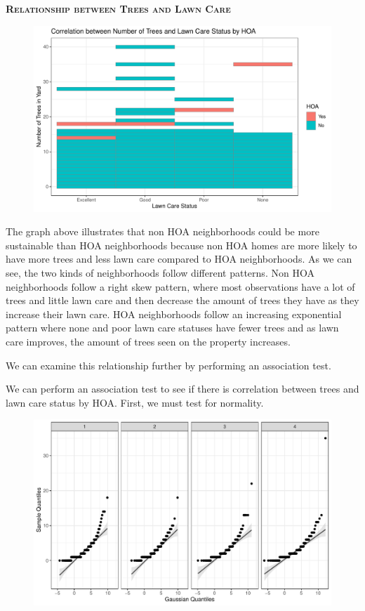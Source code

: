 \documentclass{article}
\begin{document}
\newpage
\textsc{\textbf{Relationship between Trees and Lawn Care}}
\newline
\newline
\begin{figure}[H]
		\centering
\includegraphics{exam23-038}
		\label{Fig:plot15}
	\end{figure}
The graph above illustrates that non HOA neighborhoods could be more sustainable than HOA neighborhoods because non HOA homes are more likely to have more trees and less lawn care compared to HOA neighborhoods. As we can see, the two kinds of neighborhoods follow different patterns. Non HOA neighborhoods follow a right skew pattern, where most observations have a lot of trees and little lawn care and then decrease the amount of trees they have as they increase their lawn care. HOA neighborhoods follow an increasing exponential pattern where none and poor lawn care statuses have fewer trees and as lawn care improves, the amount of trees seen on the property increases.

We can examine this relationship further by performing an association test. 

We can perform an association test to see if there is correlation between trees and lawn care status by HOA. First, we must test for normality. 
\newline
\begin{figure}[H]
		\centering
\includegraphics{exam23-039}
		\label{Fig:plot16}
	\end{figure}
	
\end{document}
